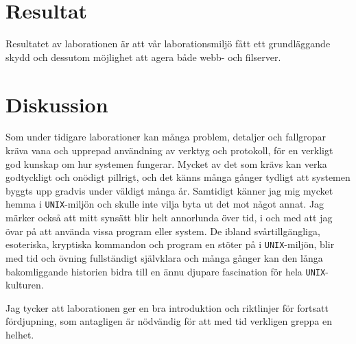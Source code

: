 %
%
%


\section{Resultat}
Resultatet av laborationen är att vår laborationsmiljö fått ett grundläggande
skydd och dessutom möjlighet att agera både webb- och filserver.

\section{Diskussion}
Som under tidigare laborationer kan många problem, detaljer och fallgropar
kräva vana och upprepad användning av verktyg och protokoll, för en verkligt
god kunskap om hur systemen fungerar. Mycket av det som krävs kan verka
godtyckligt och onödigt pillrigt, och det känns många gånger tydligt att
systemen byggts upp gradvis under väldigt många år. Samtidigt känner jag mig
mycket hemma i \texttt{UNIX}-miljön och skulle inte vilja byta ut det mot något
annat. Jag märker också att mitt synsätt blir helt annorlunda över tid, i 
och med att jag övar på att använda vissa program eller system. De ibland
svårtillgängliga, esoteriska, kryptiska kommandon och program en stöter på i
\texttt{UNIX}-miljön, blir med tid och övning fullständigt självklara och många
gånger kan den långa bakomliggande historien bidra till en ännu djupare
fascination för hela \texttt{UNIX}-kulturen.

Jag tycker att laborationen ger en bra introduktion och riktlinjer för fortsatt
fördjupning, som antagligen är nödvändig för att med tid verkligen greppa en
helhet.



